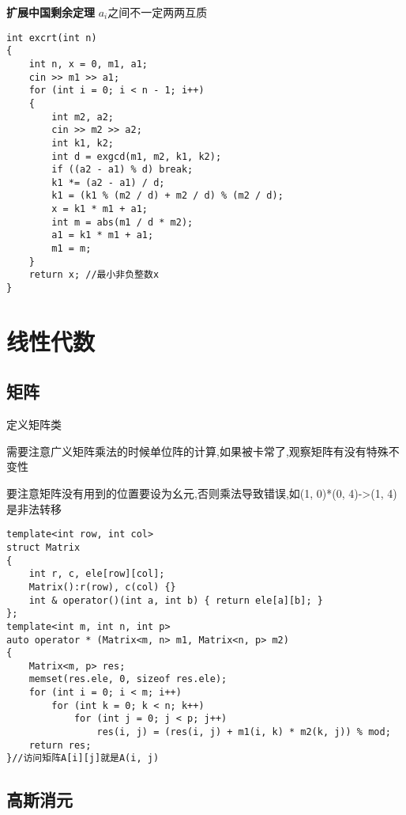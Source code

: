 \documentclass[a4paper, fontset=none]{ctexart}
\begin{document}
\textbf{扩展中国剩余定理} $a_i$之间不一定两两互质

\begin{verbatim}
int excrt(int n)
{
    int n, x = 0, m1, a1;
    cin >> m1 >> a1;
    for (int i = 0; i < n - 1; i++)
    {
        int m2, a2;
        cin >> m2 >> a2;
        int k1, k2;
        int d = exgcd(m1, m2, k1, k2);
        if ((a2 - a1) % d) break;
        k1 *= (a2 - a1) / d;
        k1 = (k1 % (m2 / d) + m2 / d) % (m2 / d);
        x = k1 * m1 + a1;
        int m = abs(m1 / d * m2);
        a1 = k1 * m1 + a1;
        m1 = m;
    }
    return x; //最小非负整数x
}
\end{verbatim}

\section{线性代数}
\subsection{矩阵}

定义矩阵类

需要注意广义矩阵乘法的时候单位阵的计算,如果被卡常了,观察矩阵有没有特殊不变性

要注意矩阵没有用到的位置要设为幺元,否则乘法导致错误,如(1, 0)*(0, 4)->(1, 4)是非法转移

\begin{verbatim}
template<int row, int col>
struct Matrix
{
    int r, c, ele[row][col];
    Matrix():r(row), c(col) {}
    int & operator()(int a, int b) { return ele[a][b]; }
};
template<int m, int n, int p>
auto operator * (Matrix<m, n> m1, Matrix<n, p> m2)
{
    Matrix<m, p> res;
    memset(res.ele, 0, sizeof res.ele);
    for (int i = 0; i < m; i++)
        for (int k = 0; k < n; k++)
            for (int j = 0; j < p; j++)
                res(i, j) = (res(i, j) + m1(i, k) * m2(k, j)) % mod;
    return res;
}//访问矩阵A[i][j]就是A(i, j)
\end{verbatim}
\subsection{高斯消元}
\end{document}
